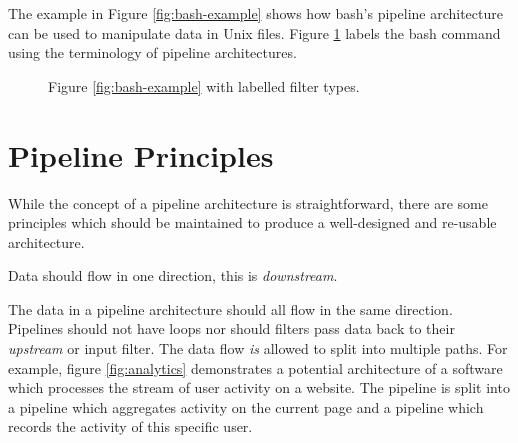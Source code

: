 The example in Figure \ref{fig:bash-example} shows how bash's pipeline architecture can be used to manipulate data in Unix files.
Figure \ref{fig:bash-example-labelled} labels the bash command using the terminology of pipeline architectures.

\begin{figure}[H]
    \centering
{}
\caption{Figure \ref{fig:bash-example} with labelled filter types.}
\label{fig:bash-example-labelled}
\end{figure}

\section{Pipeline Principles}
While the concept of a pipeline architecture is straightforward,
there are some principles which should be maintained to produce a well-designed and re-usable architecture.

\begin{definition}
    Data should flow in one direction, this is \textsl{downstream}.
\end{definition}

The data in a pipeline architecture should all flow in the same direction.
Pipelines should not have loops nor should filters pass data back to their \textsl{upstream} or input filter.
The data flow \textsl{is} allowed to split into multiple paths.
For example, figure \ref{fig:analytics} demonstrates a potential architecture of a software which processes the stream of user activity on a website.
The pipeline is split into a pipeline which aggregates activity on the current page and a pipeline which records the activity of this specific user.

